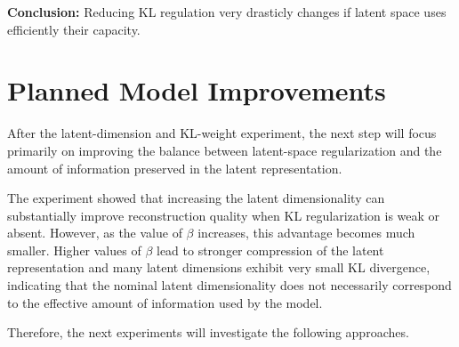 \documentclass[a4paper,11pt]{article}
\begin{document}

\textbf{Conclusion:} Reducing KL regulation very drasticly changes if latent space uses efficiently their capacity.


\section{Planned Model Improvements}

After the latent-dimension and KL-weight experiment, the next step will focus primarily on improving the balance between latent-space regularization and the amount of information preserved in the latent representation.

The experiment showed that increasing the latent dimensionality can substantially improve reconstruction quality when KL regularization is weak or absent. However, as the value of $\beta$ increases, this advantage becomes much smaller. Higher values of $\beta$ lead to stronger compression of the latent representation and many latent dimensions exhibit very small KL divergence, indicating that the nominal latent dimensionality does not necessarily correspond to the effective amount of information used by the model.

Therefore, the next experiments will investigate the following approaches.
\end{document}
